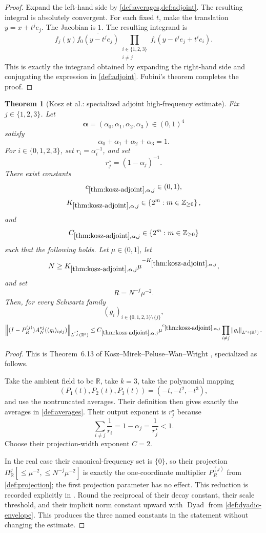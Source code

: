 \documentclass[11pt]{article}
\newtheorem{theorem}{Theorem}[section]
\newcommand{\R}{\mathbb{R}}
\newcommand{\Dyad}{\operatorname{Dyad}}
\newcommand{\norm}[2]{\left\lVert #1\right\rVert_{#2}}
\newcommand{\Cst}[2]{C_{\ref{#1},#2}}
\newcommand{\Thr}[2]{K_{\ref{#1},#2}}
\newcommand{\set}[1]{\left\{#1\right\}}
\newcommand{\indices}{\{1,2,3\}}
\begin{document}
	\begin{proof}
		Expand the left-hand side by \cref{def:averages,def:adjoint}.  The resulting integral is absolutely convergent.  For each fixed \(t\), make the translation \(y=x+t^j e_j\).  The Jacobian is \(1\).  The resulting integrand is
		\[
		f_j(y)\overline{f_0(y-t^j e_j)}
		\prod_{\substack{i\in\indices\\i\neq j}}f_i(y-t^j e_j+t^i e_i).
		\]
		This is exactly the integrand obtained by expanding the right-hand side and conjugating the expression in \cref{def:adjoint}.  Fubini's theorem completes the proof.
	\end{proof}
	
	\begin{theorem}[Kosz et al.: specialized adjoint high-frequency estimate]\label{thm:kosz-adjoint}
		Fix \(j\in\indices\).  Let
		\[
		\boldsymbol\alpha=(\alpha_0,\alpha_1,\alpha_2,\alpha_3)\in(0,1)^4
		\]
		satisfy
		\[
		\alpha_0+\alpha_1+\alpha_2+\alpha_3=1.
		\]
		For \(i\in\{0,1,2,3\}\), set \(r_i=\alpha_i^{-1}\), and set
		\[
		r_j^\star=(1-\alpha_j)^{-1}.
		\]
		There exist constants
		\[
		c_{\ref{thm:kosz-adjoint},\boldsymbol\alpha,j}\in(0,1),
		\]
		\[
		\Thr{thm:kosz-adjoint}{\boldsymbol\alpha,j}\in\set{2^m:m\in\mathbb Z_{\geq0}},
		\]
		and
		\[
		\Cst{thm:kosz-adjoint}{\boldsymbol\alpha,j}\in\set{2^m:m\in\mathbb Z_{\geq0}}
		\]
		such that the following holds.  Let \(\mu\in(0,1]\), let
		\[
		N\geq\Thr{thm:kosz-adjoint}{\boldsymbol\alpha,j}
		\mu^{-\Thr{thm:kosz-adjoint}{\boldsymbol\alpha,j}},
		\]
		and set
		\[
		R=N^{-j}\mu^{-2}.
		\]
		Then, for every Schwartz family
		\[
		(g_i)_{i\in\{0,1,2,3\}\setminus\{j\}},
		\]
		\[
		\norm{(I-P_R^{(j)})A_N^{*j}((g_i)_{i\neq j})}{L^{r_j^\star}(\R^3)}
		\leq
		\Cst{thm:kosz-adjoint}{\boldsymbol\alpha,j}
		\mu^{c_{\ref{thm:kosz-adjoint},\boldsymbol\alpha,j}}
		\prod_{i\neq j}\norm{g_i}{L^{r_i}(\R^3)}.
		\]
	\end{theorem}
	
	\begin{proof}
		This is Theorem~6.13 of Kosz--Mirek--Peluse--Wan--Wright \cite[Theorem~6.13]{KoszEtAl}, specialized as follows.
		
		Take the ambient field to be \(\R\), take \(k=3\), take the polynomial mapping
		\[
		(P_1(t),P_2(t),P_3(t))=(-t,-t^2,-t^3),
		\]
		and use the nontruncated averages.  Their definition then gives exactly the averages in \cref{def:averages}.  Their output exponent is \(r_j^\star\) because
		\[
		\sum_{i\neq j}\frac1{r_i}=1-\alpha_j=\frac1{r_j^\star}<1.
		\]
		Choose their projection-width exponent \(C=2\).
		
		In the real case their canonical-frequency set is \(\{0\}\), so their projection \(\Pi_\R^j[\leq\mu^{-2},\leq N^{-j}\mu^{-2}]\) is exactly the one-coordinate multiplier \(P_R^{(j)}\) from \cref{def:projection}; the first projection parameter has no effect.  This reduction is recorded explicitly in \cite[Remark~6.9(i)]{KoszEtAl}.  Round the reciprocal of their decay constant, their scale threshold, and their implicit norm constant upward with \(\Dyad\) from \cref{def:dyadic-envelope}.  This produces the three named constants in the statement without changing the estimate.
	\end{proof}
	
\end{document}
